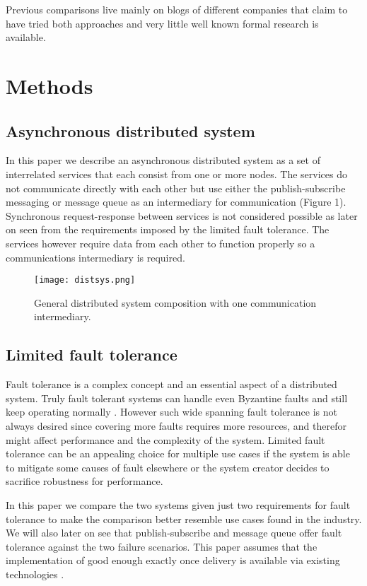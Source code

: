 \documentclass[conference]{IEEEtran}
\begin{document}
Previous comparisons live mainly on blogs of different companies that claim to have tried both approaches and very little well known formal research is available.

\section{Methods}

\subsection{Asynchronous distributed system}
In this paper we describe an asynchronous distributed system as a set of interrelated services that each consist from one or more nodes. The services do not communicate directly with each other but use either the publish-subscribe messaging or message queue as an intermediary for communication (Figure 1). Synchronous request-response between services is not considered possible as later on seen from the requirements imposed by the limited fault tolerance. The services however require data from each other to function properly so a communications intermediary is required.

\begin{figure}[!t]
    \centering
    \texttt{[image: distsys.png]}
    \caption{General distributed system composition with one communication intermediary.}
\end{figure}

\subsection{Limited fault tolerance}
Fault tolerance is a complex concept and an essential aspect of a distributed system. Truly fault tolerant systems can handle even Byzantine faults and still keep operating normally \cite{pracbyzfaultol}. However such wide spanning fault tolerance is not always desired since covering more faults requires more resources, and therefor might affect performance and the complexity of the system. Limited fault tolerance can be an appealing choice for multiple use cases if the system is able to mitigate some causes of fault elsewhere or the system creator decides to sacrifice robustness for performance.

In this paper we compare the two systems given just two requirements for fault tolerance to make the comparison better resemble use cases found in the industry. We will also later on see that publish-subscribe and message queue offer fault tolerance against the two failure scenarios. This paper assumes that the implementation of good enough exactly once delivery is available via existing technologies \cite{exonce}.
\end{document}
